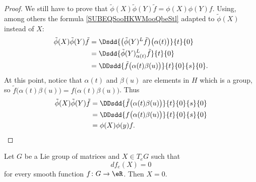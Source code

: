 \begin{proof}
	We still have to prove that \( \tilde \phi(X)\tilde \phi(Y)\tilde f=\phi(X)\phi(Y)f\). Using, among others the formula \ref{SUBEQSooHKWMooQbeStl} adapted to \( \tilde \phi(X)\) instead of \( X\):
	\begin{subequations}
		\begin{align}
			\tilde \phi(X)\tilde \phi(Y)\tilde f & =\Dsdd{ \big( \tilde \phi(Y)^L\tilde f \big)\big( \alpha(t) \big) }{t}{0} \\
			                                     & =\Dsdd{ \tilde \phi(Y)^L_{\alpha(t)}\tilde f }{t}{0}                      \\
			                                     & =\DDsdd{ \tilde f\big( \alpha(t)\beta(u) \big) }{t}{0}{s}{0}.
		\end{align}
	\end{subequations}
	At this point, notice that \( \alpha(t)\) and \( \beta(u)\) are elements in \( H\) which is a group, so \( \tilde f\big( \alpha(t)\beta(u) \big)=f\big( \alpha(t)\beta(u) \big)\). Thus
	\begin{subequations}
		\begin{align}
			\tilde \phi(X)\tilde \phi(Y)\tilde f & =\DDsdd{ \tilde f\big( \alpha(t)\beta(u) \big) }{t}{0}{s}{0} \\
			                                     & =\DDsdd{ f\big( \alpha(t)\beta(u) \big) }{t}{0}{s}{0}        \\
			                                     & =\phi(X)\phi(y)f.
		\end{align}
	\end{subequations}
\end{proof}

\begin{lemma}
	Let \( G\) be a Lie group of matrices and \( X\in T_eG\) such that
	\begin{equation}
		df_e(X)=0
	\end{equation}
	for every smooth function \( f\colon G\to \eR\). Then \( X=0\).
\end{lemma}

